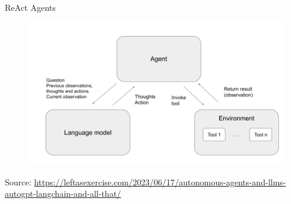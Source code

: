 \documentclass[handout]{beamer}
\begin{document}
\begin{frame}{ReAct Agents}
\scriptsize
      \begin{figure}[h]
	\includegraphics[scale = 0.3]{pics/react.png}
\end{figure}
Source: \url{https://leftasexercise.com/2023/06/17/autonomous-agents-and-llms-autogpt-langchain-and-all-that/}
\end{frame}






\end{document}
